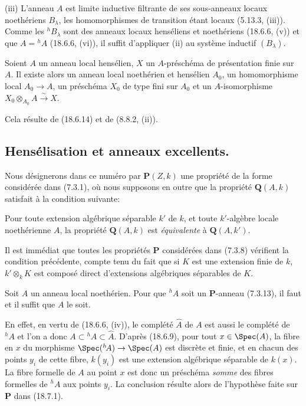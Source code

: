 (iii) L'anneau $A$ est limite inductive filtrante de ses sous-anneaux locaux noethériens $B_\lambda$, les homomorphismes de transition étant locaux (5.13.3, (iii)). Comme les ${}^h\!B_\lambda$ sont des anneaux locaux henséliens et noethériens (18.6.6, (v)) et que $A={}^h\!A$ (18.6.6, (vi)), il suffit d'appliquer (ii) au système inductif $(B_\lambda)$.

\begin{corollary}[18.6.15]
\label{IV.18.6.15}
Soient $A$ un anneau local hensélien, $X$ un $A$-préschéma de présentation finie sur $A$. Il existe alors un anneau local noethérien et hensélien $A_0$, un homomorphisme local $A_0\to A$, un préschéma $X_0$ de type fini sur $A_0$ et un $A$-isomorphisme $X_0\otimes_{A_0}A\xrightarrow{\sim}X$.
\end{corollary}

Cela résulte de (18.6.14) et de (8.8.2, (ii)).

\subsection{Hensélisation et anneaux excellents.}
\label{subsection:IV.18.7}

\begin{env}[18.7.1]
\label{IV.18.7.1}
Nous désignerons dans ce numéro par $\mathbf P(Z,k)$ une propriété de la forme considérée dans (7.3.1), où nous supposons en outre que la propriété $\mathbf Q(A,k)$ satisfait à la condition suivante:

Pour toute extension algébrique séparable $k'$ de $k$, et toute $k'$-algèbre locale noethérienne $A$, la propriété $\mathbf Q(A,k)$ est \emph{équivalente} à $\mathbf Q(A,k')$.

Il est immédiat que toutes les propriétés $\mathbf P$ considérées dans (7.3.8) vérifient la condition précédente, compte tenu du fait que si $K$ est une extension finie de $k$, $k'\otimes_k K$ est composé direct d'extensions algébriques séparables de $K$.
\end{env}


\begin{proposition}[18.7.2]
\label{IV.18.7.2}
Soit $A$ un anneau local noethérien. Pour que ${}^h\!A$ soit un $\mathbf P$-anneau (7.3.13), il faut et il suffit que $A$ le soit.
\end{proposition}

En effet, en vertu de (18.6.6, (iv)), le complété $\widehat A$ de $A$ est aussi le complété de ${}^h\!A$ et l'on a donc $A\subset{}^h\!A\subset\widehat A$. D'après (18.6.9), pour tout $x\in\Spec(A)$, la fibre en $x$ du morphisme $\Spec({}^h\!A)\to\Spec(A)$ est discrète et finie, et en chacun des points $y_i$ de cette fibre, $k(y_i)$ est une extension algébrique séparable de $k(x)$. La fibre formelle de $A$ au point $x$ est donc un préschéma \emph{somme} des fibres formelles de ${}^h\!A$ aux points $y_i$. La conclusion résulte alors de l'hypothèse faite sur $\mathbf P$ dans (18.7.1).

